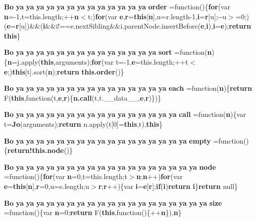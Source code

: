 \begin{DoxyCompactItemize}
\item 
{\bf Bo} {\bf ya} {\bf ya} {\bf ya} {\bf ya} {\bf ya} {\bf ya} {\bf ya} {\bf ya} {\bf ya} {\bf ya} {\bf ya} {\bf ya} {\bf ya} {\bf order} =function()\{{\bf for}(var {\bf n}=-\/1,t=this.\+length;++{\bf n}$<$t;){\bf for}(var {\bf e},{\bf r}={\bf this}[{\bf n}],u=r.\+length-\/1,{\bf i}={\bf r}[u];-\/-\/u$>$=0;)({\bf e}={\bf r}[u])\&\&({\bf i}\&\&i!==e.\+next\+Sibling\&\&i.\+parent\+Node.\+insert\+Before({\bf e},{\bf i}),{\bf i}={\bf e});{\bf return} {\bf this}\}
\item 
{\bf Bo} {\bf ya} {\bf ya} {\bf ya} {\bf ya} {\bf ya} {\bf ya} {\bf ya} {\bf ya} {\bf ya} {\bf ya} {\bf ya} {\bf ya} {\bf ya} {\bf ya} {\bf sort} =function({\bf n})\{{\bf n}=j.\+apply({\bf this},arguments);{\bf for}(var t=-\/1,{\bf e}=this.\+length;++t$<${\bf e};){\bf this}[t].sort({\bf n});{\bf return} {\bf this.\+order}()\}
\item 
{\bf Bo} {\bf ya} {\bf ya} {\bf ya} {\bf ya} {\bf ya} {\bf ya} {\bf ya} {\bf ya} {\bf ya} {\bf ya} {\bf ya} {\bf ya} {\bf ya} {\bf ya} {\bf ya} {\bf each} =function({\bf n})\{{\bf return} F({\bf this},function(t,{\bf e},{\bf r})\{{\bf n.\+call}(t,t.\+\_\+\+\_\+data\+\_\+\+\_\+,{\bf e},{\bf r})\})\}
\item 
{\bf Bo} {\bf ya} {\bf ya} {\bf ya} {\bf ya} {\bf ya} {\bf ya} {\bf ya} {\bf ya} {\bf ya} {\bf ya} {\bf ya} {\bf ya} {\bf ya} {\bf ya} {\bf ya} {\bf ya} {\bf call} =function({\bf n})\{var t={\bf Jo}(arguments);{\bf return} n.\+apply(t[0]={\bf this},t),{\bf this}\}
\item 
{\bf Bo} {\bf ya} {\bf ya} {\bf ya} {\bf ya} {\bf ya} {\bf ya} {\bf ya} {\bf ya} {\bf ya} {\bf ya} {\bf ya} {\bf ya} {\bf ya} {\bf ya} {\bf ya} {\bf ya} {\bf ya} {\bf empty} =function()\{{\bf return!this.\+node}()\}
\item 
{\bf Bo} {\bf ya} {\bf ya} {\bf ya} {\bf ya} {\bf ya} {\bf ya} {\bf ya} {\bf ya} {\bf ya} {\bf ya} {\bf ya} {\bf ya} {\bf ya} {\bf ya} {\bf ya} {\bf ya} {\bf ya} {\bf ya} {\bf node} =function()\{{\bf for}(var {\bf n}=0,t=this.\+length;t$>${\bf n};{\bf n}++){\bf for}(var {\bf e}={\bf this}[{\bf n}],{\bf r}=0,u=e.\+length;u$>${\bf r};{\bf r}++)\{var {\bf i}={\bf e}[{\bf r}];{\bf if}({\bf i}){\bf return} {\bf i}\}{\bf return} null\}
\item 
{\bf Bo} {\bf ya} {\bf ya} {\bf ya} {\bf ya} {\bf ya} {\bf ya} {\bf ya} {\bf ya} {\bf ya} {\bf ya} {\bf ya} {\bf ya} {\bf ya} {\bf ya} {\bf ya} {\bf ya} {\bf ya} {\bf ya} {\bf ya} {\bf size} =function()\{var {\bf n}=0;{\bf return} F({\bf this},function()\{++{\bf n}\}),{\bf n}\}

\end{DoxyCompactItemize}
